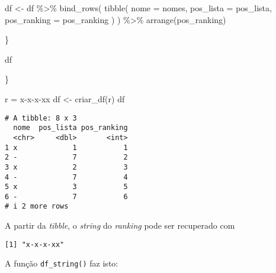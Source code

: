 \documentclass[
  letterpaper,
  DIV=11,
  numbers=noendperiod]{scrreprt}
\newenvironment{Shaded}{\begin{snugshade}}{\end{snugshade}}
\newcommand{\AttributeTok}[1]{\textcolor[rgb]{0.40,0.45,0.13}{#1}}
\newcommand{\ControlFlowTok}[1]{\textcolor[rgb]{0.00,0.23,0.31}{#1}}
\newcommand{\FunctionTok}[1]{\textcolor[rgb]{0.28,0.35,0.67}{#1}}
\newcommand{\NormalTok}[1]{\textcolor[rgb]{0.00,0.23,0.31}{#1}}
\newcommand{\OtherTok}[1]{\textcolor[rgb]{0.00,0.23,0.31}{#1}}
\newcommand{\SpecialCharTok}[1]{\textcolor[rgb]{0.37,0.37,0.37}{#1}}
\newcommand{\StringTok}[1]{\textcolor[rgb]{0.13,0.47,0.30}{#1}}
\begin{document}
\begin{Shaded}
\begin{Highlighting}[]
\NormalTok{    df }\OtherTok{\textless{}{-}}\NormalTok{ df }\SpecialCharTok{\%\textgreater{}\%} 
      \FunctionTok{bind\_rows}\NormalTok{(}
        \FunctionTok{tibble}\NormalTok{(}
          \AttributeTok{nome =}\NormalTok{ nomes,}
          \AttributeTok{pos\_lista =}\NormalTok{ pos\_lista,}
          \AttributeTok{pos\_ranking =}\NormalTok{ pos\_ranking}
\NormalTok{        )}
\NormalTok{      ) }\SpecialCharTok{\%\textgreater{}\%} 
      \FunctionTok{arrange}\NormalTok{(pos\_ranking)}
      
\NormalTok{  \}}
  
\NormalTok{  df}
  
\NormalTok{\}}
\end{Highlighting}
\end{Shaded}

\begin{Shaded}
\begin{Highlighting}[]
\NormalTok{r }\OtherTok{=} \StringTok{\textquotesingle{}x{-}x{-}x{-}xx\textquotesingle{}}
\NormalTok{df }\OtherTok{\textless{}{-}} \FunctionTok{criar\_df}\NormalTok{(r)}
\NormalTok{df}
\end{Highlighting}
\end{Shaded}

\begin{verbatim}
# A tibble: 8 x 3
  nome  pos_lista pos_ranking
  <chr>     <dbl>       <int>
1 x             1           1
2 -             7           2
3 x             2           3
4 -             7           4
5 x             3           5
6 -             7           6
# i 2 more rows
\end{verbatim}

A partir da \emph{tibble}, o \emph{string} do \emph{ranking} pode ser
recuperado com

\begin{Shaded}
\end{Shaded}

\begin{verbatim}
[1] "x-x-x-xx"
\end{verbatim}

A função \texttt{df\_string()} faz isto:

\begin{Shaded}
\end{Shaded}
\end{document}
